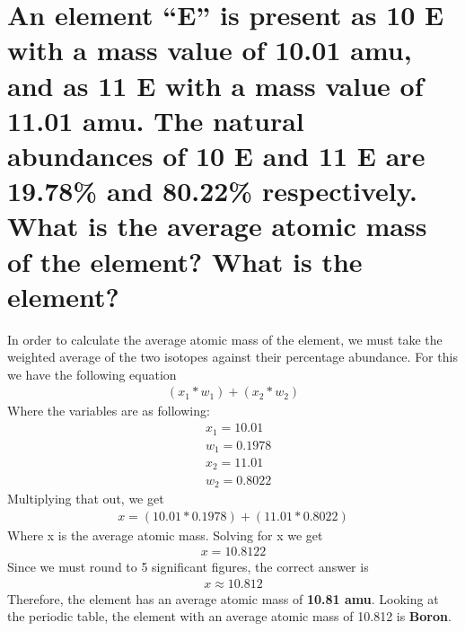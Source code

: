 \documentclass{scrartcl}
\begin{document}
\section{An element “E” is present as 10 E with a mass value of 10.01 amu, and as 11 E with a mass value of 11.01 amu. The natural abundances of 10 E and 11 E are 19.78\% and 80.22\% respectively. What is the average atomic mass of the element? What is the element?}
\label{sec:orge251566}
In order to calculate the average atomic mass of the element, we must take the
 weighted average of the two isotopes against their percentage abundance. For
 this we have the following equation
\begin{align*}
(x_1*w_1)+(x_2*w_2)
\end{align*}
Where the variables are as following:
\begin{align*}
&x_{1}=10.01\\
&w_{1}=0.1978\\
&x_{2}=11.01\\
&w_{2}=0.8022
\end{align*}
Multiplying that out, we get
\begin{align*}
x=(10.01*0.1978)+(11.01*0.8022)
\end{align*}
Where x is the average atomic mass. Solving for x we get
\begin{align*}
x=10.8122
\end{align*}
Since we must round to 5 significant figures, the correct answer is
\begin{align*}
x\approx10.812
\end{align*}
Therefore, the element has an average atomic mass of \textbf{10.81 amu}. Looking at the periodic table, the element with an average atomic mass of 10.812 is \textbf{Boron}.
\end{document}

